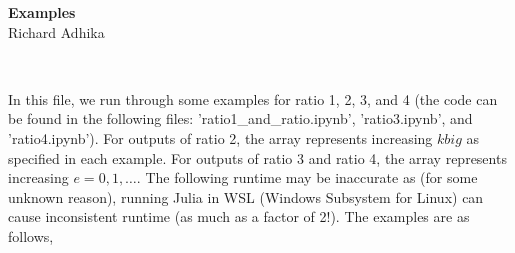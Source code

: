 \documentclass[letterpaper,12pt]{article}
\begin{document}

\begin{center}
    {\Huge \textbf{Examples}} \\
    Richard Adhika
\end{center}

\

In this file, we run through some examples 
for ratio 1, 2, 3, and 4 (the code can be found in the following files:
'ratio1\_and\_ratio.ipynb', 'ratio3.ipynb', and 'ratio4.ipynb'). 
For outputs of ratio 2, the array represents increasing $kbig$ as specified in each example.
For outputs of ratio 3 and ratio 4, the array represents increasing $e = 0, 1, \dots$.
The following runtime may be inaccurate as (for some unknown reason),
running Julia in WSL (Windows Subsystem for Linux) can cause inconsistent runtime 
(as much as a factor of 2!).
The examples are as follows,
\end{document}
